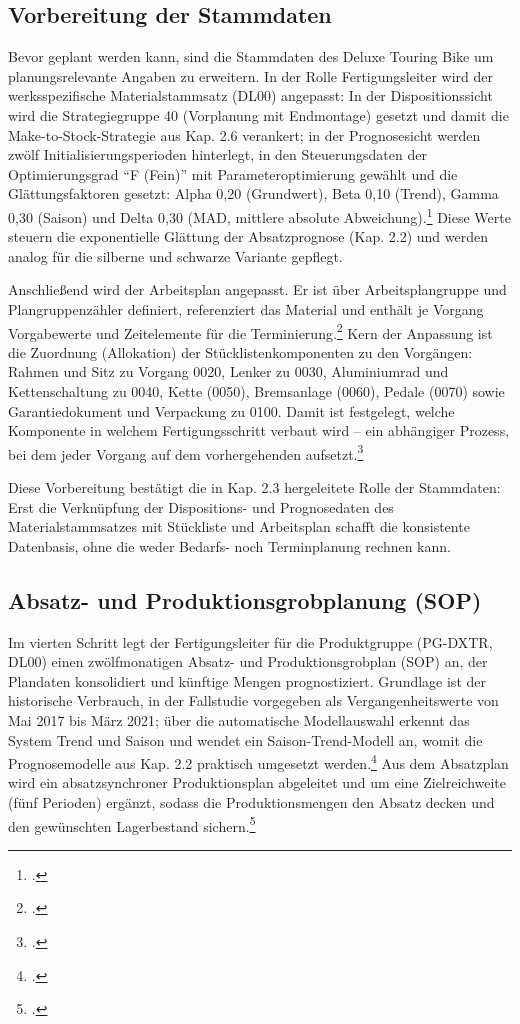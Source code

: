\subsection{Vorbereitung der Stammdaten}
Bevor geplant werden kann, sind die Stammdaten des Deluxe Touring Bike um planungsrelevante Angaben zu erweitern. In der Rolle Fertigungsleiter wird der werksspezifische Materialstammsatz (DL00) angepasst: In der Dispositionssicht wird die Strategiegruppe 40 (Vorplanung mit Endmontage) gesetzt und damit die Make-to-Stock-Strategie aus Kap. 2.6 verankert; in der Prognosesicht werden zwölf Initialisierungsperioden hinterlegt, in den Steuerungsdaten der Optimierungsgrad \enquote{F (Fein)} mit Parameteroptimierung gewählt und die Glättungsfaktoren gesetzt: Alpha 0,20 (Grundwert), Beta 0,10 (Trend), Gamma 0,30 (Saison) und Delta 0,30 (MAD, mittlere absolute Abweichung).\footcite[Vgl.][S. 6]{Boldau.2023} Diese Werte steuern die exponentielle Glättung der Absatzprognose (Kap. 2.2) und werden analog für die silberne und schwarze Variante gepflegt.

Anschließend wird der Arbeitsplan angepasst. Er ist über Arbeitsplangruppe und Plangruppenzähler definiert, referenziert das Material und enthält je Vorgang Vorgabewerte und Zeitelemente für die Terminierung.\footcite[Vgl.][S. 8 f.]{Boldau.2023} Kern der Anpassung ist die Zuordnung (Allokation) der Stücklistenkomponenten zu den Vorgängen: Rahmen und Sitz zu Vorgang 0020, Lenker zu 0030, Aluminiumrad und Kettenschaltung zu 0040, Kette (0050), Bremsanlage (0060), Pedale (0070) sowie Garantiedokument und Verpackung zu 0100. Damit ist festgelegt, welche Komponente in welchem Fertigungsschritt verbaut wird -- ein abhängiger Prozess, bei dem jeder Vorgang auf dem vorhergehenden aufsetzt.\footcite[Vgl.][S. 9 f.]{Boldau.2023}

Diese Vorbereitung bestätigt die in Kap. 2.3 hergeleitete Rolle der Stammdaten: Erst die Verknüpfung der Dispositions- und Prognosedaten des Materialstammsatzes mit Stückliste und Arbeitsplan schafft die konsistente Datenbasis, ohne die weder Bedarfs- noch Terminplanung rechnen kann.

\subsection{Absatz- und Produktionsgrobplanung (SOP)}
Im vierten Schritt legt der Fertigungsleiter für die Produktgruppe (PG-DXTR, DL00) einen zwölfmonatigen Absatz- und Produktionsgrobplan (SOP) an, der Plandaten konsolidiert und künftige Mengen prognostiziert. Grundlage ist der historische Verbrauch, in der Fallstudie vorgegeben als Vergangenheitswerte von Mai 2017 bis März 2021; über die automatische Modellauswahl erkennt das System Trend und Saison und wendet ein Saison-Trend-Modell an, womit die Prognosemodelle aus Kap. 2.2 praktisch umgesetzt werden.\footcite[Vgl.][S. 14 ff.]{Boldau.2023} Aus dem Absatzplan wird ein absatzsynchroner Produktionsplan abgeleitet und um eine Zielreichweite (fünf Perioden) ergänzt, sodass die Produktionsmengen den Absatz decken und den gewünschten Lagerbestand sichern.\footcite[Vgl.][S. 16 f.]{Boldau.2023}

